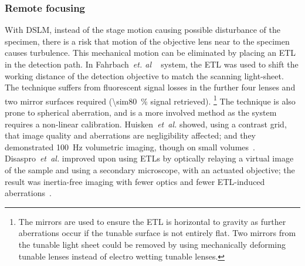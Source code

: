 \subsubsection{Remote focusing}

With \gls{DSLM}, instead of the stage motion causing possible disturbance of the specimen, there is a risk that motion of the objective lens near to the specimen causes turbulence.
This mechanical motion can be eliminated by placing an
\gls{ETL} in the detection path.
In Fahrbach~\emph{et. al} ~\cite{fahrbachRapid3DLightsheet2013} system, the \gls{ETL} was used to shift the \gls{working distance} of the detection objective to match the scanning \gls{light-sheet}.
The technique suffers from fluorescent signal losses in the further four lenses and two mirror surfaces required (\SI{\sim80}{\%} signal retrieved).
\footnote{The mirrors are used to ensure the \gls{ETL} is horizontal to gravity as further aberrations occur if the tunable surface is not entirely flat.
Two mirrors from the tunable light sheet could be removed by using mechanically deforming tunable lenses instead of electro wetting tunable lenses.}
The technique is also prone to spherical aberration, and is a more involved method as the system requires a non-linear calibration.
Huisken~\emph{et~al.} showed, using a contrast grid, that image quality and aberrations are negligibility affected;
and they demonstrated
\SI{100}{\hertz} volumetric imaging, though on small volumes~\cite{fahrbachRapid3DLightsheet2013}.
Disaspro~\emph{et~al.} improved upon using \gls{ETL}s by optically relaying a virtual image of the sample and using a secondary microscope, with an actuated objective; the result was inertia-free imaging with fewer optics and fewer \gls{ETL}-induced aberrations~\cite{duocastellaFastInertiaFreeVolumetric2017c}.



